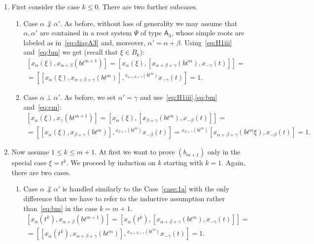 \documentclass[oneside, 10pt]{amsart}
\numberwithin{equation}{section}
\numberwithin{lemma}{section}
\theoremstyle{definition}
\theoremstyle{remark}
\begin{document}
\begin{enumerate}
\item \label{case:1} First consider the case $k \leq 0$. There are two further subcases.
 \begin{enumerate}
  \item \label{case:1a} Case $\alpha \not \perp \alpha'$. 
  As before, without loss of generality we may assume that $\alpha, \alpha'$ are contained in a root system $\Psi$ of type $\mathsf{A}_3$,
   whose simple roots are labeled as in~\eqref{eq:diagA3} and, moreover, $\alpha'=\alpha + \beta$.
  Using~\eqref{eq:H1iii} and~\eqref{eq:bm} we get (recall that $\xi \in B_k$):
   \begin{multline} \nonumber
   [x_\alpha(\xi), x_{\alpha+\beta}(bt^{m+1})] = [x_\alpha(\xi), [x_{\alpha+\beta+\gamma}(bt^m), x_{-\gamma}(t)]] = \\   
  = [[x_\alpha(\xi), x_{\alpha+\beta+\gamma}(bt^m)], {}^{x_{\alpha+\beta+\gamma}(bt^m)}\!x_{-\gamma}(t)] = 1.
  \end{multline}
  \item Case $\alpha \perp \alpha'$. As before, we set $\alpha' = \gamma$ and use~\eqref{eq:H1iii},\eqref{eq:bm} and~\eqref{eq:cm}:
  \begin{multline} \nonumber
   [x_\alpha(\xi), x_{\gamma}(bt^{m+1})] = [x_\alpha(\xi), [x_{\beta+\gamma}(bt^m), x_{-\beta}(t)]] = \\   
  = [[x_\alpha(\xi), x_{\beta+\gamma}(bt^m)], {}^{x_{\beta+\gamma}(bt^m)}\!x_{-\beta}(t)] = {}^{x_{\beta+\gamma}(bt^m)}\![x_{\alpha+\beta+\gamma}(bt^m\xi), x_{-\beta}(t)] = 1.
  \end{multline}
 \end{enumerate} 
  
\item \label{case:2} Now assume $1 \leq k \leq m+1$. 
At first we want to prove $(b_{m+1})$ only in the special case $\xi=t^k$.
We proceed by induction on $k$ starting with $k=1$.
Again, there are two cases.
\begin{enumerate}
 \item \label{case:2a} Case $\alpha\not\perp\alpha'$ is handled similarly to the Case~\eqref{case:1a} with the only
  difference that we have to refer to the inductive assumption rather than~\eqref{eq:bm} in the case $k=m+1$.
  \begin{multline} \nonumber
   [x_\alpha(t^k), x_{\alpha+\beta}(bt^{m+1})] = [x_\alpha(t^k), [x_{\alpha+\beta+\gamma}(bt^m), x_{-\gamma}(t)]] = \\   
  = [[x_\alpha(t^k), x_{\alpha+\beta+\gamma}(bt^m)], {}^{x_{\alpha+\beta+\gamma}(bt^m)}\!x_{-\gamma}(t)] = 1.
  \end{multline}


\end{enumerate}
\end{enumerate}
\end{document}
